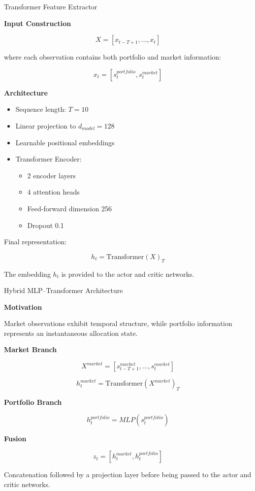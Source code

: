 \documentclass[10pt]{beamer}
\begin{document}
\begin{frame}{Transformer Feature Extractor}

\textbf{Input Construction}

\[
X =
[x_{t-T+1}, \dots, x_t]
\]

where each observation contains both portfolio and market information:

\[
x_t =
[s_t^{portfolio}, s_t^{market}]
\]

\textbf{Architecture}

\begin{itemize}
    \item Sequence length: $T = 10$
    \item Linear projection to $d_{model}=128$
    \item Learnable positional embeddings
    \item Transformer Encoder:
    \begin{itemize}
        \item 2 encoder layers
        \item 4 attention heads
        \item Feed-forward dimension 256
        \item Dropout 0.1
    \end{itemize}
\end{itemize}

Final representation:

\[
h_t = \mathrm{Transformer}(X)_T
\]

The embedding $h_t$ is provided to the actor and critic networks.

\end{frame}

\begin{frame}{Hybrid MLP--Transformer Architecture}

\textbf{Motivation}

Market observations exhibit temporal structure, while portfolio information
represents an instantaneous allocation state.

\pause
\vspace{0.3cm}

\textbf{Market Branch}

\[
X^{market}
=
[s^{market}_{t-T+1}, \dots, s^{market}_{t}]
\]

\[
h_t^{market} = \mathrm{Transformer}(X^{market})_T
\]

\pause
\vspace{0.2cm}

\textbf{Portfolio Branch}

\[
h_t^{portfolio}
=
MLP(s_t^{portfolio})
\]

\vspace{0.2cm}

\textbf{Fusion}

\[
z_t =
[h_t^{market}, h_t^{portfolio}]
\]

Concatenation followed by a projection layer before being passed to the actor
and critic networks.

\end{frame}
\end{document}
